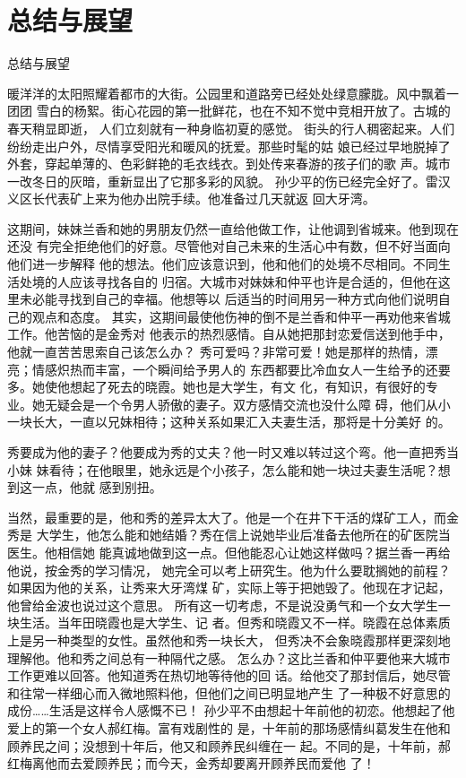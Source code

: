 \chapter{总结与展望}

 总结与展望
 
 
 
 
 暖洋洋的太阳照耀着都市的大街。公园里和道路旁已经处处绿意朦胧。风中飘着一团团
 雪白的杨絮。街心花园的第一批鲜花，也在不知不觉中竞相开放了。古城的春天稍显即逝，
 人们立刻就有一种身临初夏的感觉。
 街头的行人稠密起来。人们纷纷走出户外，尽情享受阳光和暖风的抚爱。那些时髦的姑
 娘已经过早地脱掉了外套，穿起单薄的、色彩鲜艳的毛衣线衣。到处传来春游的孩子们的歌
 声。城市一改冬日的灰暗，重新显出了它那多彩的风貌。
 孙少平的伤已经完全好了。雷汉义区长代表矿上来为他办出院手续。他准备过几天就返
 回大牙湾。
 
 这期间，妹妹兰香和她的男朋友仍然一直给他做工作，让他调到省城来。他到现在还没
 有完全拒绝他们的好意。尽管他对自己未来的生活心中有数，但不好当面向他们进一步解释
 他的想法。他们应该意识到，他和他们的处境不尽相同。不同生活处境的人应该寻找各自的
 归宿。大城市对妹妹和仲平也许是合适的，但他在这里未必能寻找到自己的幸福。他想等以
 后适当的时间用另一种方式向他们说明自己的观点和态度。
 其实，这期间最使他伤神的倒不是兰香和仲平一再劝他来省城工作。他苦恼的是金秀对
 他表示的热烈感情。自从她把那封恋爱信送到他手中，他就一直苦苦思索自己该怎么办？
 秀可爱吗？非常可爱！她是那样的热情，漂亮；情感炽热而丰富，一个瞬间给予男人的
 东西都要比冷血女人一生给予的还要多。她使他想起了死去的晓霞。她也是大学生，有文
 化，有知识，有很好的专业。她无疑会是一个令男人骄傲的妻子。双方感情交流也没什么障
 碍，他们从小一块长大，一直以兄妹相待；这种关系如果汇入夫妻生活，那将是十分美好
 的。
 
 秀要成为他的妻子？他要成为秀的丈夫？他一时又难以转过这个弯。他一直把秀当小妹
 妹看待；在他眼里，她永远是个小孩子，怎么能和她一块过夫妻生活呢？想到这一点，他就
 感到别扭。
 
 当然，最重要的是，他和秀的差异太大了。他是一个在井下干活的煤矿工人，而金秀是
 大学生，他怎么能和她结婚？秀在信上说她毕业后准备去他所在的矿医院当医生。他相信她
 能真诚地做到这一点。但他能忍心让她这样做吗？据兰香一再给他说，按金秀的学习情况，
 她完全可以考上研究生。他为什么要耽搁她的前程？如果因为他的关系，让秀来大牙湾煤
 矿，实际上等于把她毁了。他现在才记起，他曾给金波也说过这个意思。
 所有这一切考虑，不是说没勇气和一个女大学生一块生活。当年田晓霞也是大学生、记
 者。但秀和晓霞又不一样。晓霞在总体素质上是另一种类型的女性。虽然他和秀一块长大，
 但秀决不会象晓霞那样更深刻地理解他。他和秀之间总有一种隔代之感。
 怎么办？这比兰香和仲平要他来大城市工作更难以回答。他知道秀在热切地等待他的回
 话。给他交了那封信后，她尽管和往常一样细心而入微地照料他，但他们之间已明显地产生
 了一种极不好意思的成份……生活是这样令人感慨不已！
 孙少平不由想起十年前他的初恋。他想起了他爱上的第一个女人郝红梅。富有戏剧性的
 是，十年前的那场感情纠葛发生在他和顾养民之间；没想到十年后，他又和顾养民纠缠在一
 起。不同的是，十年前，郝红梅离他而去爱顾养民；而今天，金秀却要离开顾养民而爱他
 了！
 
